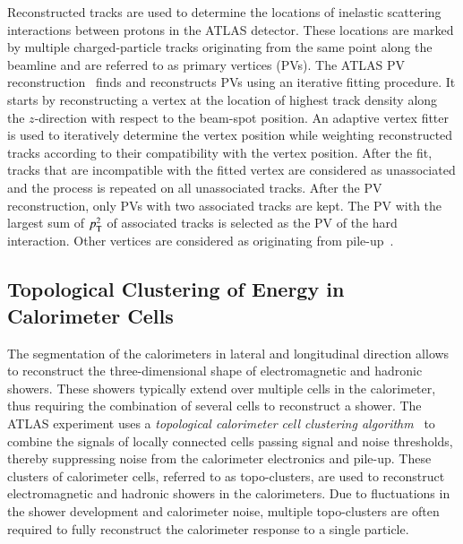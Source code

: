 Reconstructed tracks are used to determine the locations of inelastic scattering
interactions between protons in the ATLAS detector. These locations are marked
by multiple charged-particle tracks originating from the same point along the
beamline and are referred to as primary vertices (PVs).
The ATLAS PV reconstruction~\cite{PERF-2015-01} finds and reconstructs PVs using
an iterative fitting procedure. It starts by reconstructing a vertex at the
location of highest track density along the $z$-direction with respect to the
beam-spot position. An adaptive vertex fitter~\cite{Fruhwirth:2007hz} is used to
iteratively determine the vertex position while weighting reconstructed tracks
according to their compatibility with the vertex position. After the fit, tracks
that are incompatible with the fitted vertex are considered as unassociated and
the process is repeated on all unassociated tracks. After the PV reconstruction,
only PVs with two associated tracks are kept. The PV with the largest sum of
$p_{\text{T}}^2$ of associated tracks is selected as the PV of the hard
interaction. Other vertices are considered as originating from
pile-up~\cite{PERF-2015-01}.


\subsection{Topological Clustering of Energy in Calorimeter Cells}

The segmentation of the calorimeters in lateral and longitudinal direction
allows to reconstruct the three-dimensional shape of electromagnetic and
hadronic showers. These showers typically extend over multiple cells in the
calorimeter, thus requiring the combination of several cells to reconstruct a
shower. The ATLAS experiment uses a \emph{topological calorimeter cell
  clustering algorithm}~\cite{PERF-2014-07} to combine the signals of locally
connected cells passing signal and noise thresholds, thereby suppressing noise
from the calorimeter electronics and pile-up. These clusters of calorimeter
cells, referred to as topo-clusters, are used to reconstruct electromagnetic and
hadronic showers in the calorimeters. Due to fluctuations in the shower
development and calorimeter noise, multiple topo-clusters are often required to
fully reconstruct the calorimeter response to a single particle.

